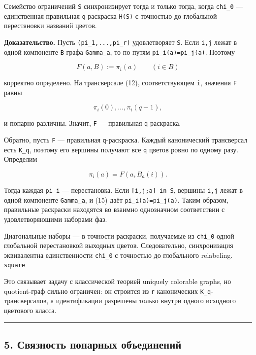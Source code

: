 Семейство ограничений \texttt{S} синхронизирует тогда и только тогда,
когда \texttt{chi\_0} --- единственная правильная \texttt{q}-раскраска
\texttt{H(S)} с точностью до глобальной перестановки названий цветов.

\textbf{Доказательство.} Пусть \texttt{(pi\_1,...,pi\_r)} удовлетворяет
\texttt{S}. Если \texttt{i,j} лежат в одной компоненте \texttt{B} графа
\texttt{Gamma\_a}, то по путям \texttt{pi\_i(a)=pi\_j(a)}. Поэтому

\[
F(a,B):=\pi_i(a)\qquad(i\in B)
\tag{14}
\]

корректно определено. На трансверсале (12), соответствующем \texttt{i},
значения \texttt{F} равны

\[
\pi_i(0),\ldots,\pi_i(q-1),
\]

и попарно различны. Значит, \texttt{F} --- правильная
\texttt{q}-раскраска.

Обратно, пусть \texttt{F} --- правильная \texttt{q}-раскраска. Каждый
канонический трансверсал есть \texttt{K\_q}, поэтому его вершины
получают все \texttt{q} цветов ровно по одному разу. Определим

\[
\pi_i(a)=F(a,B_a(i)).
\tag{15}
\]

Тогда каждая \texttt{pi\_i} --- перестановка. Если
\texttt{{[}i,j;a{]}\ in\ S}, вершины \texttt{i,j} лежат в одной
компоненте \texttt{Gamma\_a}, и (15) даёт \texttt{pi\_i(a)=pi\_j(a)}.
Таким образом, правильные раскраски находятся во взаимно однозначном
соответствии с удовлетворяющими наборами фаз.

Диагональные наборы --- в точности раскраски, получаемые из
\texttt{chi\_0} одной глобальной перестановкой выходных цветов.
Следовательно, синхронизация эквивалентна единственности \texttt{chi\_0}
с точностью до глобального relabeling. \texttt{square}

Это связывает задачу с классической теорией uniquely colorable graphs,
но quotient-граф сильно ограничен: он строится из \texttt{r}
канонических \texttt{K\_q}-трансверсалов, а идентификации разрешены
только внутри одного исходного цветового класса.

\begin{center}\rule{0.5\linewidth}{0.5pt}\end{center}

\hypertarget{ux441ux432ux44fux437ux43dux43eux441ux442ux44c-ux43fux43eux43fux430ux440ux43dux44bux445-ux43eux431ux44aux435ux434ux438ux43dux435ux43dux438ux439}{%
\subsection{5. Связность попарных
объединений}\label{ux441ux432ux44fux437ux43dux43eux441ux442ux44c-ux43fux43eux43fux430ux440ux43dux44bux445-ux43eux431ux44aux435ux434ux438ux43dux435ux43dux438ux439}}

